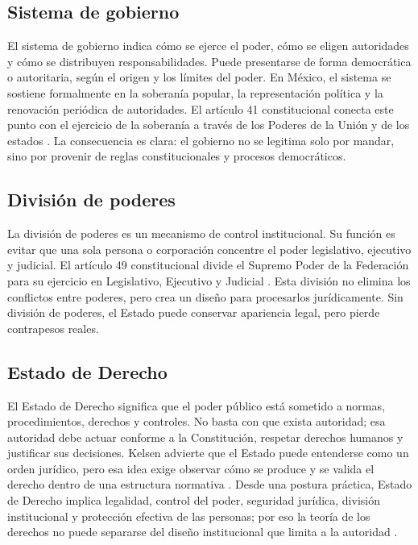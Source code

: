 \documentclass[
spanish,
letterpaper, oneside
]{article}
\begin{document}
	\subsection{Sistema de gobierno}
	
	El sistema de gobierno indica cómo se ejerce el poder, cómo se eligen autoridades y cómo se distribuyen responsabilidades. Puede presentarse de forma democrática o autoritaria, según el origen y los límites del poder. En México, el sistema se sostiene formalmente en la soberanía popular, la representación política y la renovación periódica de autoridades. El artículo 41 constitucional conecta este punto con el ejercicio de la soberanía a través de los Poderes de la Unión y de los estados \citep{cpeum2026}. La consecuencia es clara: el gobierno no se legitima solo por mandar, sino por provenir de reglas constitucionales y procesos democráticos.
	
	\subsection{División de poderes}
	
	La división de poderes es un mecanismo de control institucional. Su función es evitar que una sola persona o corporación concentre el poder legislativo, ejecutivo y judicial. El artículo 49 constitucional divide el Supremo Poder de la Federación para su ejercicio en Legislativo, Ejecutivo y Judicial \citep{cpeum2026}. Esta división no elimina los conflictos entre poderes, pero crea un diseño para procesarlos jurídicamente. Sin división de poderes, el Estado puede conservar apariencia legal, pero pierde contrapesos reales.
	
	\subsection{Estado de Derecho}
	
	El Estado de Derecho significa que el poder público está sometido a normas, procedimientos, derechos y controles. No basta con que exista autoridad; esa autoridad debe actuar conforme a la Constitución, respetar derechos humanos y justificar sus decisiones. Kelsen advierte que el Estado puede entenderse como un orden jurídico, pero esa idea exige observar cómo se produce y se valida el derecho dentro de una estructura normativa \citep{kelsen1982}. Desde una postura práctica, Estado de Derecho implica legalidad, control del poder, seguridad jurídica, división institucional y protección efectiva de las personas; por eso la teoría de los derechos no puede separarse del diseño institucional que limita a la autoridad \citep{ansutegui2007}.
	
\end{document}
